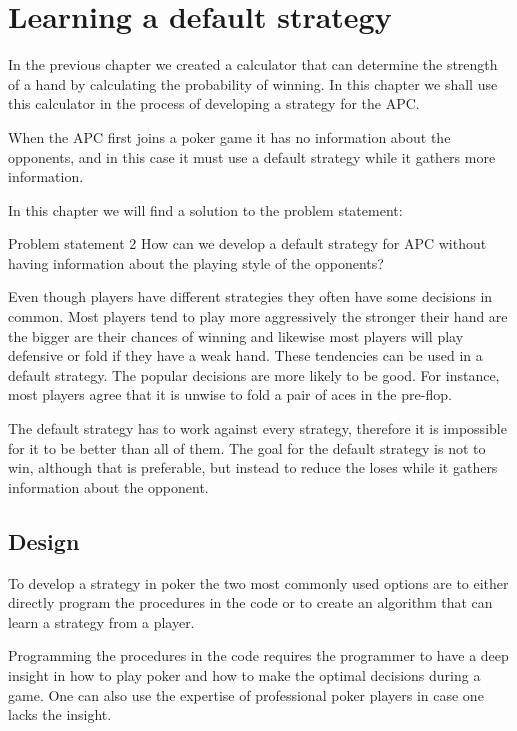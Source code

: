 \section{Learning a default strategy}
\label{sec:part2}
In the previous chapter we created a calculator that can determine the strength of a hand by calculating the probability of winning. In this chapter we shall use this calculator in the process of developing a strategy for the APC.

When the APC first joins a poker game it has no information about the opponents, and in this case it must use a default strategy while it gathers more information.

In this chapter we will find a solution to the problem statement:

\vspace{4mm}
\begin{statementBox2}{Problem statement 2}
How can we develop a default strategy for APC without having information about the playing style of the opponents?
\end{statementBox2}
\vspace{4mm}

Even though players have different strategies they often have some decisions in common. Most players tend to play more aggressively the stronger their hand are the bigger are their chances of winning and likewise most players will play defensive or fold if they have a weak hand. These tendencies can be used in a default strategy. The popular decisions are more likely to be good. For instance, most players agree that it is unwise to fold a pair of aces in the pre-flop. 

The default strategy has to work against every strategy, therefore it is impossible for it to be better than all of them. The goal for the default strategy is not to win, although that is preferable, but instead to reduce the loses while it gathers information about the opponent.

\subsection{Design}
To develop a strategy in poker the two most commonly used options are to either directly program the procedures in the code or to create an algorithm that can learn a strategy from a player. 

Programming the procedures in the code requires the programmer to have a deep insight in how to play poker and how to make the optimal decisions during a game. One can also use the expertise of professional poker players in case one lacks the insight.

